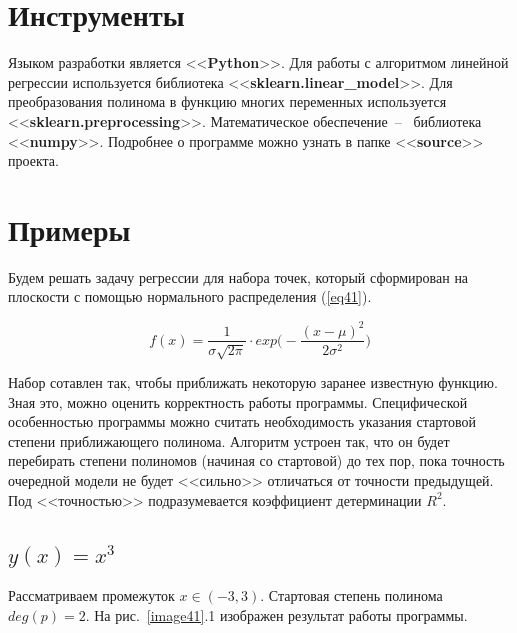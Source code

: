 \documentclass[12pt, a4paper]{article}
\begin{document}
    \section{Инструменты}
    
    Языком разработки является <<\textbf{Python}>>. Для работы с алгоритмом 
    линейной регрессии используется библиотека 
    <<\textbf{sklearn.linear\_model}>>. Для преобразования полинома в 
    функцию многих переменных используется 
    <<\textbf{sklearn.preprocessing}>>. Математическое обеспечение~--~
    библиотека <<\textbf{numpy}>>. Подробнее о программе можно узнать в 
    папке <<\textbf{source}>> проекта.
    
    \section{Примеры}
    
    Будем решать задачу регрессии для набора точек, который сформирован на 
    плоскости с помощью нормального распределения (\ref{eq41}).
    
    \begin{equation}
        f(x) = \frac{1}{\sigma \sqrt{2\pi}} \cdot exp\Big(-\frac{(x - 
            \mu)^{2}}{2\sigma^{2}}\Big)
        \label{eq41}
    \end{equation}
    
    Набор сотавлен так, чтобы приближать некоторую заранее известную 
    функцию. Зная это, можно оценить корректность работы программы. 
    Специфической особенностью программы можно считать необходимость 
    указания стартовой степени приближающего полинома. Алгоритм устроен так, 
    что он будет перебирать степени полиномов (начиная со стартовой) до тех 
    пор, пока точность очередной модели не будет <<сильно>> отличаться от 
    точности предыдущей. Под <<точностью>> подразумевается коэффициент 
    детерминации $R^{2}$.
    
    \subsection{$y(x) = x^{3}$}
    
    Рассматриваем промежуток $x \in (-3, 3)$. Стартовая степень полинома 
    $deg(p) = 2$. На рис.~\ref{image41}.1 изображен результат работы 
    программы.
    
\end{document}
